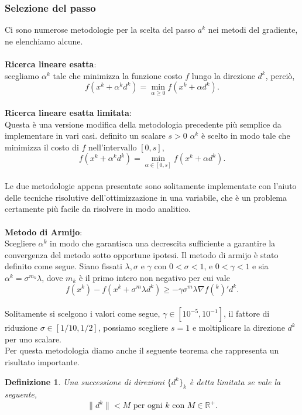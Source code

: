 \documentclass[a4paper, 12pt]{article}
\newtheorem{definition}{Definizione}
\begin{document}
\subsubsection{Selezione del passo}
Ci sono numerose metodologie per la scelta del passo $a^k$ nei metodi del gradiente, ne elenchiamo alcune.\\\\
\textbf{Ricerca lineare esatta}:\\
scegliamo $\alpha^k$ tale che minimizza la funzione costo $f$ lungo la direzione $d^k$, perciò,\\
\[f(x^k + \alpha^k d^k) = \min_{\alpha \geq 0} f(x^k + \alpha d^k).\]\\
\textbf{Ricerca lineare esatta limitata}:\\
Questa è una versione modifica della metodologia precedente più semplice da implementare in vari casi. definito un scalare $s > 0$ $\alpha^k$ è scelto in modo tale che minimizza il costo di $f$ nell'intervallo $[0, s]$,\\
\[f(x^k + \alpha^k d^k) = \min_{\alpha \in [0, s]} f(x^k + \alpha d^k).\]\\
Le due metodologie appena presentate sono solitamente implementate con l'aiuto delle tecniche risolutive dell'ottimizzazione in una variabile, che è un problema certamente più facile da risolvere in modo analitico.\\\\
\textbf{Metodo di Armijo}:\\
Scegliere $\alpha^k$ in modo che garantisca una decrescita sufficiente a garantire la convergenza del metodo sotto opportune ipotesi. Il metodo di armijo è stato definito come segue. Siano fissati $\lambda, \sigma$ e $\gamma$ con $0 < \sigma < 1$, e $0 < \gamma < 1$ e sia $\alpha^k = \sigma^{m_k} \lambda$, dove $m_k$ è il primo intero non negativo per cui vale\\
\[f(x^k) - f(x^k + \sigma^m \lambda d^k) \geq -\gamma \sigma^m \lambda \nabla f(^k)'d^k.\]\\
Solitamente si scelgono i valori come segue, $\gamma \in [10^{-5}, 10^{-1}]$, il fattore di riduzione $\sigma \in [1/10, 1/2]$, possiamo scegliere $s = 1$ e moltiplicare la direzione $d^k$ per uno scalare.\\
Per questa metodologia diamo anche il seguente teorema che rappresenta un risultato importante.
\begin{definition}
Una successione di direzioni $\{d^k\}_k$ è detta limitata se vale la seguente,\\ \[\parallel d^k \parallel < M \mbox{ per ogni } k \mbox{ con } M \in \mathbb{R}^+.\]
\end{definition}
\end{document}
